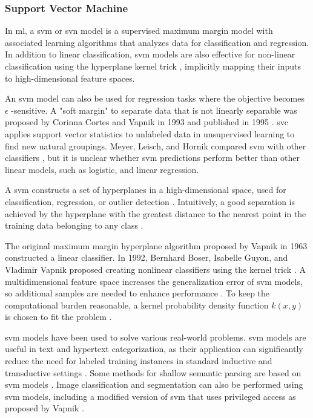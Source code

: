 \documentclass[sn-mathphys-num]{sn-jnl}%
\begin{document}
\subsubsection{Support Vector Machine}

In \acrlong{ml}, a \acrfull{svm} or \acrfull{svn} model is a supervised maximum margin model with associated learning algorithms that analyzes data for classification and regression. In addition to linear classification, \acrshort{svm} models are also effective for non-linear classification using the hyperplane kernel trick \cite{Boser1992}, implicitly mapping their inputs to high-dimensional feature spaces.

An \acrshort{svm} model can also be used for regression tasks where the objective becomes $\epsilon$ -sensitive. A "soft margin" to separate data that is not linearly separable was proposed by Corinna Cortes and Vapnik in 1993 and published in 1995 \cite{Cortes1995}. \acrfull{svc} \cite{BenHur2001} applies support vector statistics to unlabeled data in unsupervised learning to find new natural groupings. Meyer, Leisch, and Hornik compared \acrshort{svm} with other classifiers \cite{Meyer2003}, but it is unclear whether \acrshort{svm} predictions perform better than other linear models, such as logistic, and linear regression.

A \acrshort{svm} constructs a set of hyperplanes in a high-dimensional space, used for classification, regression, or outlier detection \cite{scikit-learn2023}. Intuitively, a good separation is achieved by the hyperplane with the greatest distance to the nearest point in the training data belonging to any class \cite{HastieRosset2009}.

The original maximum margin hyperplane algorithm proposed by Vapnik in 1963 constructed a linear classifier. In 1992, Bernhard Boser, Isabelle Guyon, and Vladimir Vapnik proposed creating nonlinear classifiers using the kernel trick \cite{Boser1992, Aizerman1964}. A multidimensional feature space increases the generalization error of \acrshort{svm} models, so additional samples are needed to enhance performance \cite{Jin2012}. To keep the computational burden reasonable, a kernel probability density function $k(x, y)$ is chosen to fit the problem \cite{Press2007}.

\acrshort{svm} models have been used to solve various real-world problems. \acrshort{svm} models are useful in text and hypertext categorization, as their application can significantly reduce the need for labeled training instances in standard inductive and transductive settings \cite{Joachims1998}. Some methods for shallow semantic parsing are based on \acrshort{svm} models \cite{Pradhan2004}. Image classification and segmentation can also be performed using \acrshort{svm} models, including a modified version of \acrshort{svm} that uses privileged access as proposed by Vapnik \cite{Laurent2014, Barghout2015}.
\end{document}
